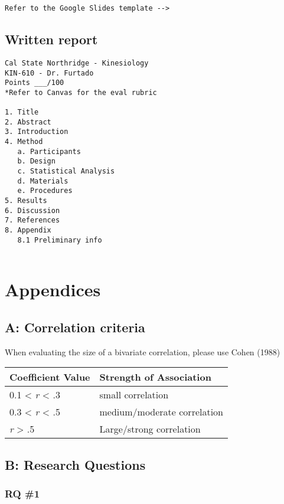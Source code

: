 \documentclass[
]{article}
\begin{document}
\begin{verbatim}
Refer to the Google Slides template --> 
\end{verbatim}

\hypertarget{written-report}{%
\subsection{Written report}\label{written-report}}

\begin{verbatim}
Cal State Northridge - Kinesiology
KIN-610 - Dr. Furtado
Points ___/100
*Refer to Canvas for the eval rubric

1. Title
2. Abstract
3. Introduction
4. Method
   a. Participants
   b. Design
   c. Statistical Analysis
   d. Materials
   e. Procedures
5. Results
6. Discussion
7. References
8. Appendix
   8.1 Preliminary info
   
\end{verbatim}

\hypertarget{appendices}{%
\section{Appendices}\label{appendices}}

\hypertarget{appendix-a}{%
\subsection{A: Correlation criteria}\label{appendix-a}}

When evaluating the size of a bivariate correlation, please use Cohen (1988)

\begin{longtable}[]{@{}ll@{}}
\toprule
Coefficient Value & Strength of Association \\
\midrule
\endhead
0.1 \textless{} \emph{r} \textless{} .3 & small correlation \\
0.3 \textless{} \emph{r} \textless{} .5 & medium/moderate correlation \\
\emph{r} \textgreater{} .5 & Large/strong correlation \\
\bottomrule
\end{longtable}

\hypertarget{appendix-b}{%
\subsection{B: Research Questions}\label{appendix-b}}

\hypertarget{rq-1}{%
\subsubsection{RQ \#1}\label{rq-1}}
\end{document}
